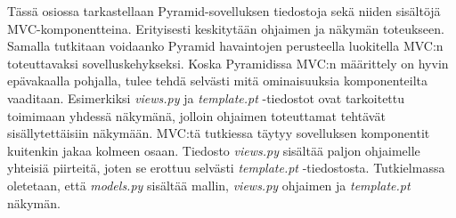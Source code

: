 \documentclass[utf8]{gradu3}
\begin{document}
Tässä osiossa tarkastellaan Pyramid-sovelluksen tiedostoja sekä niiden sisältöjä MVC-komponentteina. Erityisesti keskitytään ohjaimen ja näkymän toteukseen. Samalla tutkitaan voidaanko Pyramid havaintojen perusteella luokitella MVC:n toteuttavaksi sovelluskehykseksi.
Koska Pyramidissa MVC:n määrittely on hyvin epävakaalla pohjalla, tulee tehdä selvästi mitä ominaisuuksia komponenteilta vaaditaan. Esimerkiksi \emph{views.py} ja \emph{template.pt} -tiedostot ovat tarkoitettu toimimaan yhdessä näkymänä, jolloin ohjaimen toteuttamat tehtävät sisällytettäisiin näkymään. MVC:tä tutkiessa täytyy sovelluksen komponentit kuitenkin jakaa kolmeen osaan.  Tiedosto \emph{views.py}
sisältää paljon ohjaimelle yhteisiä piirteitä, joten se erottuu selvästi \emph{template.pt} -tiedostosta. Tutkielmassa oletetaan, että \emph{models.py} sisältää mallin, \emph{views.py} ohjaimen ja \emph{template.pt} näkymän.
\end{document}
